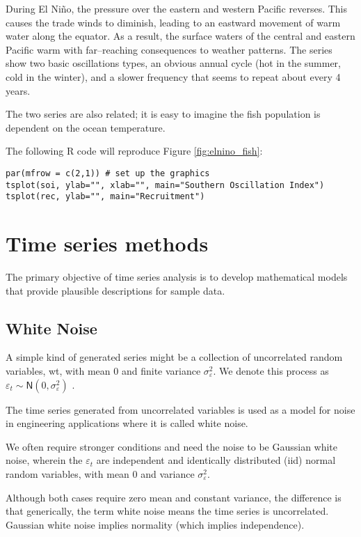 \documentclass[
paper=128mm:96mm, %
fontsize=9.5pt, %
pagesize, %
parskip=half-, %
]{scrartcl} %
\theoremstyle{mythmstyle} %
\begin{document}
During El Ni\~no, the pressure over the eastern and western Pacific reverses. This causes the trade winds to diminish, leading to an eastward movement of warm water along the equator. As a result, the surface waters of the central and eastern Pacific warm with far--reaching consequences to weather patterns. The series show two basic oscillations types, an obvious annual cycle (hot in the summer, cold in the winter), and a slower frequency that seems to repeat about every 4 years. 
\clearpage

The two series are also related; it is easy to imagine the fish population is dependent on the ocean temperature. 

The following R code will reproduce Figure \ref{fig:elnino_fish}:
%
\begin{lstlisting}[belowskip=-0.8 \baselineskip]
par(mfrow = c(2,1)) # set up the graphics
tsplot(soi, ylab="", xlab="", main="Southern Oscillation Index") 
tsplot(rec, ylab="", main="Recruitment")
\end{lstlisting}
\clearpage


\section{Time series methods}

The primary objective of time series analysis is to develop mathematical models that provide plausible descriptions for sample data.

\subsection{White Noise}

A simple kind of generated series might be a collection of uncorrelated random variables, wt, with mean 0 and finite variance $\sigma_\varepsilon^2$. We denote this process as $\varepsilon_t\sim\mathsf{N}\left(0,\sigma_\varepsilon^2\right)$ . 
 
The time series generated from uncorrelated variables is used as a model for noise in engineering applications where it is called white noise.
 
We often require stronger conditions and need the noise to be Gaussian white noise, wherein the $\varepsilon_t$ are independent and identically distributed (iid) normal random variables, with mean 0 and variance $\sigma_\varepsilon^2$.

Although both cases require zero mean and constant variance, the difference is that generically, the term white noise means the time series is uncorrelated. Gaussian white noise implies normality (which implies independence).
\end{document}

